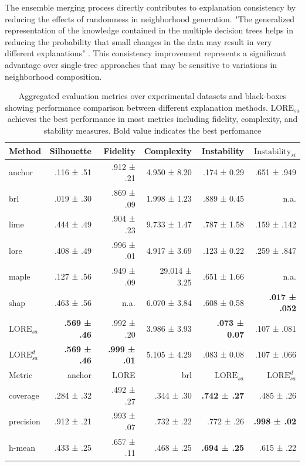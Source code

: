 The ensemble merging process directly contributes to explanation consistency by reducing the effects of randomness in neighborhood generation. "The generalized representation of the knowledge contained in the multiple decision trees helps in reducing the probability that small changes in the data may result in very different explanations" \cite{guidotti2022stable}. This consistency improvement represents a significant advantage over single-tree approaches that may be sensitive to variations in neighborhood composition.

\begin{table}[ht]
    \centering
    \caption{Aggregated evaluation metrics over experimental datasets and black-boxes showing performance comparison between different explanation methods. $\text{LORE}_{sa}$ achieves the best performance in most metrics including fidelity, complexity, and stability measures. Bold value indicates the best perfomance}
    \label{tab:lore_sa_performance}
    \begin{adjustbox}{width=\textwidth,center}
    \begin{tabular}{lrrrrr}
        \hline
        Method & Silhouette & Fidelity & Complexity & Instability & $\text{Instability}_{si}$ \\
        \hline
        anchor & .116 ± .51 & .912 ± .21 & 4.950 ± 8.20 & .174 ± 0.29 & .651 ± .949 \\
        brl & .019 ± .30 & .869 ± .09 & 1.998 ± 1.23 & .889 ± 0.45 & n.a. \\
        lime & .444 ± .49 & .904 ± .23 & 9.733 ± 1.47 & .787 ± 1.58 & .159 ± .142 \\
        lore & .408 ± .49 & .996 ± .01 & 4.917 ± 3.69 & .123 ± 0.22 & .259 ± .847 \\
        maple & .127 ± .56 & .949 ± .09 & 29.014 ± 3.25 & .651 ± 1.66 & n.a. \\
        shap & .463 ± .56 & n.a. & 6.070 ± 3.84 & .608 ± 0.58 & \textbf{.017 ± .052} \\
        $\text{LORE}_{sa}$ & \textbf{.569 ± .46} & .992 ± .20 & 3.986 ± 3.93 & \textbf{.073 ± 0.07} & .107 ± .081 \\
        $\text{LORE}^d_{sa}$ & \textbf{.569 ± .46} & \textbf{.999 ± .01} & 5.105 ± 4.29 & .083 ± 0.08 & .107 ± .066 \\
        \hline
        \hline
        Metric & anchor & LORE & brl & \textbf{$\text{LORE}_{sa}$} & \textbf{$\text{LORE}_{sa}^d$} \\
        \hline
        coverage & .284 ± .32 & .492 ± .27 & .344 ± .30 & \textbf{.742 ± .27} & .485 ± .26 \\
        \hline
        precision & .912 ± .21 & .993 ± .07 & .732 ± .22 & .772 ± .26 & \textbf{.998 ± .02} \\
        \hline
        h-mean & .433 ± .25 & .657 ± .11 & .468 ± .25 & \textbf{.694 ± .25} & .615 ± .22 \\
        \hline
    \end{tabular}
    \end{adjustbox}
\end{table}

